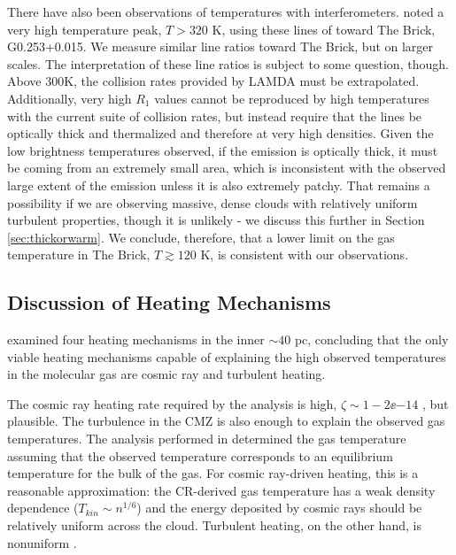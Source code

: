 There have also been observations of \para temperatures with interferometers.
\citet{Johnston2014a} noted a very high temperature peak, $T>320$ K, using these
lines of \para toward The Brick, G0.253+0.015.  We measure similar line
ratios toward The Brick, but on larger scales.  The interpretation of these
line ratios is subject to some question, though.  Above 300K, the collision
rates provided by LAMDA \citep{Green1991a,Schoier2005a,Wiesenfeld2013a} must be
extrapolated.  Additionally, very high $R_1$ values cannot be
reproduced by high temperatures with the current suite of collision rates, but
instead require that the lines be optically thick and thermalized and therefore
at very high densities.   Given the low brightness temperatures observed, if
the emission is optically thick, it must be coming from an extremely small
area, which is inconsistent with the observed large extent of the emission
unless it is also extremely patchy.  That remains a possibility if we are
observing massive, dense clouds with relatively uniform turbulent properties,
though it is unlikely - we discuss this further in Section
\ref{sec:thickorwarm}.  We conclude, therefore, that a lower limit on the
gas temperature in The Brick, $T\gtrsim120$ K, is consistent with our observations.


\subsection{Discussion of Heating Mechanisms}
\citet{Ao2013a} examined four heating mechanisms in the inner $\sim 40$ pc,
concluding that the only viable heating mechanisms capable of explaining the
high observed temperatures in the molecular gas are cosmic ray and turbulent
heating.  

The cosmic ray heating rate required by the \citet{Ao2013a} analysis is high,
$\zeta\sim1-2\ee{-14}$ \pers, but plausible.  The turbulence in the CMZ is also
enough to explain the observed gas temperatures. 
The analysis performed in \citet{Ao2013a} determined the gas temperature
assuming that the observed temperature corresponds to an equilibrium temperature
for the bulk of the gas.  For
cosmic ray-driven heating, this is a reasonable approximation: the CR-derived
gas temperature
has a weak density dependence ($T_{kin}\sim n^{1/6}$) and the energy deposited
by cosmic rays should be relatively uniform across the cloud.  Turbulent heating,
on the other hand, is nonuniform \citep{Pan2009a}.

